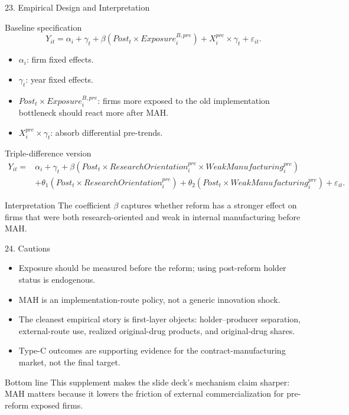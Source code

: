 \documentclass[aspectratio=169,11pt]{beamer}
\begin{document}
\begin{frame}{23. Empirical Design and Interpretation}
\footnotesize
\begin{block}{Baseline specification}
\[
Y_{it}=\alpha_i+\gamma_t+\beta\left(Post_t\times Exposure_i^{B,pre}\right)+X_i^{pre}\times\gamma_t+\varepsilon_{it}.
\]
\end{block}

\begin{itemize}
\item $\alpha_i$: firm fixed effects.
\item $\gamma_t$: year fixed effects.
\item $Post_t\times Exposure_i^{B,pre}$: firms more exposed to the old implementation bottleneck should react more after MAH.
\item $X_i^{pre}\times\gamma_t$: absorb differential pre-trends.
\end{itemize}

\begin{block}{Triple-difference version}
\[
\begin{aligned}
Y_{it}={}&\alpha_i+\gamma_t
+\beta\left(Post_t\times ResearchOrientation_i^{pre}\times WeakManufacturing_i^{pre}\right) \\
&+\theta_1\left(Post_t\times ResearchOrientation_i^{pre}\right)
+\theta_2\left(Post_t\times WeakManufacturing_i^{pre}\right)+\varepsilon_{it}.
\end{aligned}
\]
\end{block}

\begin{block}{Interpretation}
The coefficient $\beta$ captures whether reform has a stronger effect on firms that were both research-oriented and weak in internal manufacturing before MAH.
\end{block}
\end{frame}

\begin{frame}{24. Cautions}
\small
\begin{itemize}
\item Exposure should be measured before the reform; using post-reform holder status is endogenous.
\item MAH is an implementation-route policy, not a generic innovation shock.
\item The cleanest empirical story is first-layer objects: holder--producer separation, external-route use, realized original-drug products, and original-drug shares.
\item Type-C outcomes are supporting evidence for the contract-manufacturing market, not the final target.
\end{itemize}

\begin{block}{Bottom line}
This supplement makes the slide deck's mechanism claim sharper: MAH matters because it lowers the friction of external commercialization for pre-reform exposed firms.
\end{block}
\end{frame}
\end{document}
